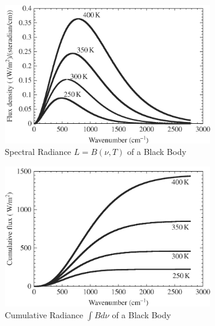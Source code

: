 \begin{figure}[H]
    \centering
    \begin{subfigure}{0.35\linewidth}
        \includegraphics[width=\linewidth]{Figures/Radiative Transfer/BB Spectral Radiance.png}
        \caption{Spectral Radiance $L=B(\nu,T)$ of a Black Body}
        \label{Spec Rad BB}
    \end{subfigure}
    \begin{subfigure}{0.35\linewidth}
        \includegraphics[width=\linewidth]{Figures/Radiative Transfer/BB Cumulative.png}
        \caption{Cumulative Radiance $\int B d\nu$ of a Black Body}
        \label{Cum BB}
    \end{subfigure}
    \begin{subfigure}{0.25\linewidth}

\end{subfigure}
\end{figure}
